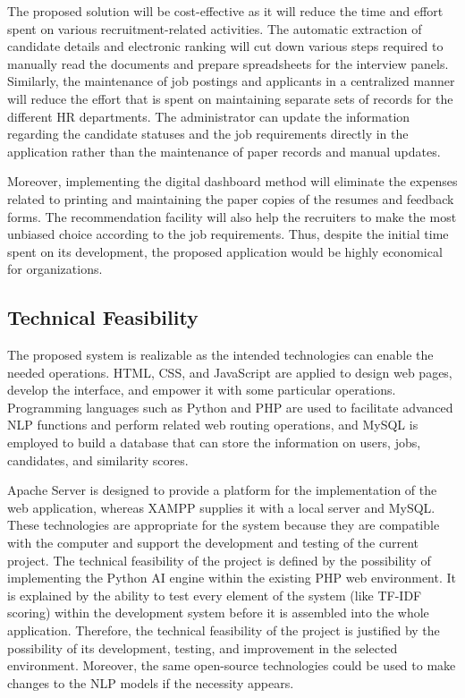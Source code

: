 \documentclass[12pt,a4paper]{report}
\begin{document}
The proposed solution will be cost-effective as it will reduce the time and effort spent on various recruitment-related activities. The automatic extraction of candidate details and electronic ranking will cut down various steps required to manually read the documents and prepare spreadsheets for the interview panels. Similarly, the maintenance of job postings and applicants in a centralized manner will reduce the effort that is spent on maintaining separate sets of records for the different HR departments. The administrator can update the information regarding the candidate statuses and the job requirements directly in the application rather than the maintenance of paper records and manual updates.

Moreover, implementing the digital dashboard method will eliminate the expenses related to printing and maintaining the paper copies of the resumes and feedback forms. The recommendation facility will also help the recruiters to make the most unbiased choice according to the job requirements. Thus, despite the initial time spent on its development, the proposed application would be highly economical for organizations.

\subsection{Technical Feasibility}

The proposed system is realizable as the intended technologies can enable the needed operations. HTML, CSS, and JavaScript are applied to design web pages, develop the interface, and empower it with some particular operations. Programming languages such as Python and PHP are used to facilitate advanced NLP functions and perform related web routing operations, and MySQL is employed to build a database that can store the information on users, jobs, candidates, and similarity scores.

Apache Server is designed to provide a platform for the implementation of the web application, whereas XAMPP supplies it with a local server and MySQL. These technologies are appropriate for the system because they are compatible with the computer and support the development and testing of the current project. The technical feasibility of the project is defined by the possibility of implementing the Python AI engine within the existing PHP web environment. It is explained by the ability to test every element of the system (like TF-IDF scoring) within the development system before it is assembled into the whole application. Therefore, the technical feasibility of the project is justified by the possibility of its development, testing, and improvement in the selected environment. Moreover, the same open-source technologies could be used to make changes to the NLP models if the necessity appears.
\end{document}
